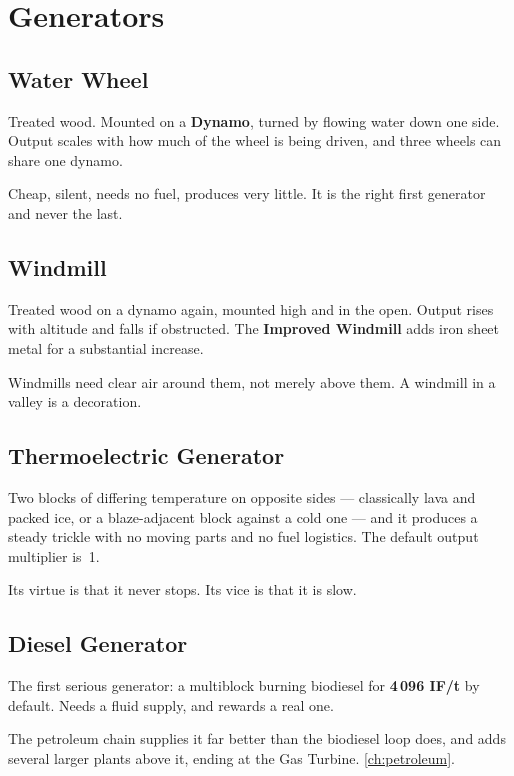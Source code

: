 \chapter{Generators}
\label{ch:generators}

\section{Water Wheel}

Treated wood. Mounted on a \textbf{Dynamo}, turned by flowing water down one side. Output scales
with how much of the wheel is being driven, and three wheels can share one dynamo.

Cheap, silent, needs no fuel, produces very little. It is the right first generator and never the
last.

\section{Windmill}

Treated wood on a dynamo again, mounted high and in the open. Output rises with altitude and falls
if obstructed. The \textbf{Improved Windmill} adds iron sheet metal for a substantial increase.

\begin{ietip}
Windmills need clear air around them, not merely above them. A windmill in a valley is a decoration.
\end{ietip}

\section{Thermoelectric Generator}

Two blocks of differing temperature on opposite sides --- classically lava and packed ice, or a
blaze-adjacent block against a cold one --- and it produces a steady trickle with no moving parts
and no fuel logistics. The default output multiplier is~1.

Its virtue is that it never stops. Its vice is that it is slow.

\section{Diesel Generator}

The first serious generator: a multiblock burning biodiesel for \textbf{4\,096 IF/t} by default.
Needs a fluid supply, and rewards a real one.

\begin{iefork}
The petroleum chain supplies it far better than the biodiesel loop does, and adds several larger
plants above it, ending at the Gas Turbine. \autoref{ch:petroleum}.
\end{iefork}

